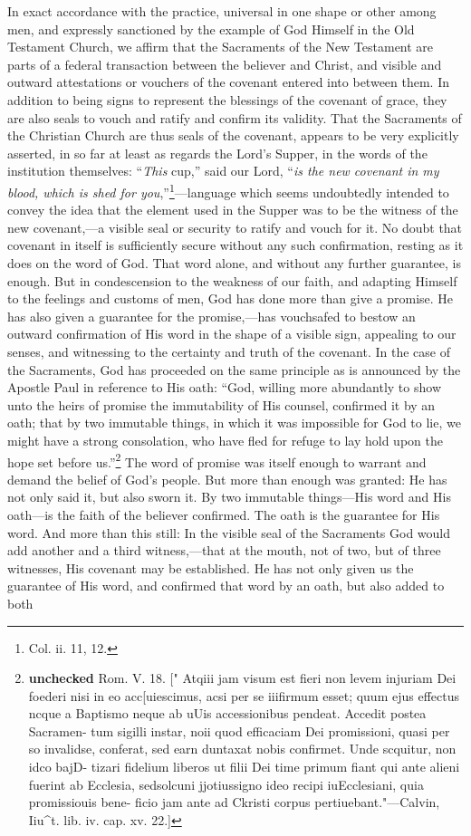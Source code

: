 \documentclass[]{book}
\begin{document}
In exact accordance with the practice, universal in one shape or other among men, and expressly sanctioned by the example of God Himself in the Old Testament Church, we affirm that the Sacraments of the New Testament are parts of a federal transaction between the believer and Christ, and visible and outward attestations or vouchers of the covenant entered into between them. In addition to being signs to represent the blessings of the covenant of grace, they are also seals to vouch and ratify and confirm its validity. That the Sacraments of the Christian Church are thus seals of the covenant, appears to be very explicitly asserted, in so far at least as regards the Lord's Supper, in the words of the institution themselves: ``\emph{This} cup,'' said our Lord, ``\emph{is the new covenant in my blood, which is shed for you},''\footnote{Col. ii. 11, 12.}---language which seems undoubtedly intended to convey the idea that the element used in the Supper was to be the witness of the new covenant,---a visible seal or security to ratify and vouch for it. No doubt that covenant in itself is sufficiently secure without any such confirmation, resting as it does on the word of God. That word alone, and without any further guarantee, is enough. But in condescension to the weakness of our faith, and adapting Himself to the feelings and customs of men, God has done more than give a promise. He has also given a guarantee for the promise,---has vouchsafed to bestow an outward confirmation of His word in the shape of a visible sign, appealing to our senses, and witnessing to the certainty and truth of the covenant. In the case of the Sacraments, God has proceeded on the same principle as is announced by the Apostle Paul in reference to His oath: ``God, willing more abundantly to show unto the heirs of promise the immutability of His counsel, confirmed it by an oath; that by two immutable things, in which it was impossible for God to lie, we might have a strong consolation, who have fled for refuge to lay hold upon the hope set before us.''\footnote{\textbf{unchecked} Rom. V. 18. {[}" Atqiii jam visum est fieri non levem injuriam Dei foederi nisi in eo acc{[}uiescimus, acsi per se iiifirmum esset; quum ejus effectus ncque a Baptismo neque ab uUis accessionibus pendeat. Accedit postea Sacramen- tum sigilli instar, noii quod efficaciam Dei promissioni, quasi per so invalidse, conferat, sed earn duntaxat nobis confirmet. Unde scquitur, non idco bajD- tizari fidelium liberos ut filii Dei time primum fiant qui ante alieni fuerint ab Ecclesia, sedsolcuni jjotiussigno ideo recipi iuEcclesiani, quia promissiouis bene- ficio jam ante ad Ckristi corpus pertiuebant."---Calvin, Iiu\^{}t. lib. iv. cap. xv. 22.{]}} The word of promise was itself enough to warrant and demand the belief of God's people. But more than enough was granted: He has not only said it, but also sworn it. By two immutable things---His word and His oath---is the faith of the believer confirmed. The oath is the guarantee for His word. And more than this still: In the visible seal of the Sacraments God would add another and a third witness,---that at the mouth, not of two, but of three witnesses, His covenant may be established. He has not only given us the guarantee of His word, and confirmed that word by an oath, but also added to both 
\end{document}
